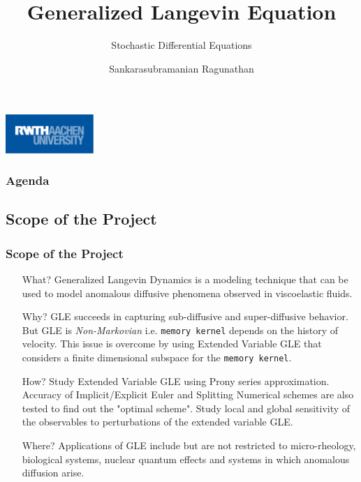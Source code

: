 \documentclass[a4paper,10pt]{beamer}
\title{Generalized Langevin Equation}
\subtitle{Stochastic Differential Equations}
\author{Sankarasubramanian Ragunathan \newline \newline 389851}
\institute{\textbf{RWTH Aachen University}}
\date{}
\begin{document}
	\begin{frame}
		\titlepage
		\centering
		\includegraphics[width=0.25\textwidth]{RWTH_Aachen_University_Logo.eps}
	\end{frame}

	\begin{frame}
	\frametitle{Agenda}
		\footnotesize
		\tableofcontents
	\end{frame}

	\begin{frame}
		\normalsize
		\section{Scope of the Project}
		\frametitle{Scope of the Project}
		
		\begin{itemize}
			\item[What?]{Generalized Langevin Dynamics is a modeling technique that can be used to model anomalous diffusive phenomena observed in viscoelastic fluids.}
			
			\item[Why?]{GLE succeeds in capturing sub-diffusive and super-diffusive behavior. But GLE is \textit{Non-Markovian} i.e. \texttt{memory kernel} depends on the history of velocity. This issue is overcome by using Extended Variable GLE that considers a finite dimensional subspace for the \texttt{memory kernel}.}
			
			\item[How?]{Study Extended Variable GLE using Prony series approximation. Accuracy of Implicit/Explicit Euler and Splitting Numerical schemes are also tested to find out the "optimal scheme". Study local and global sensitivity of the observables to perturbations of the extended variable GLE.}
			
			\item[Where?]{Applications of GLE include but are not restricted to micro-rheology, biological systems, nuclear quantum effects and systems in which anomalous diffusion arise.}
			
		\end{itemize}
	\end{frame}
\end{document}
